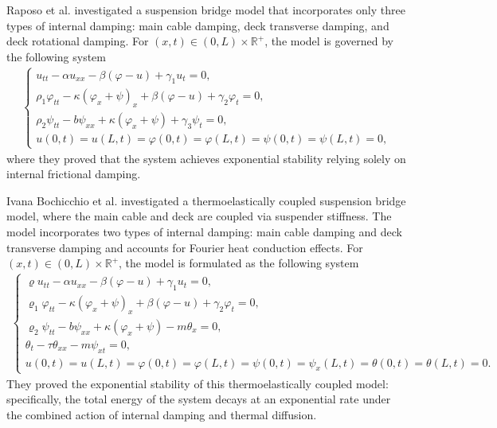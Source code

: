 \documentclass[11pt,reqno]{article}
\begin{document}
Raposo et al. \cite{MR4688212} investigated a suspension bridge model that incorporates only three types of internal damping: main cable damping, deck transverse damping, and deck rotational damping. For $(x,t) \in (0,L)\times \mathbb{R}^+$, the model is governed by the following system
	\begin{align*}
		\begin{cases}
			u_{tt} - \alpha u_{xx} - \beta(\varphi - u) + \gamma_1 u_t = 0,  \\
			\rho_1 \varphi_{tt} - \kappa (\varphi_x + \psi)_x + \beta (\varphi - u) + \gamma_2 \varphi_t = 0, \\
			\rho_2 \psi_{tt} - b \psi_{xx} + \kappa (\varphi_x + \psi) + \gamma_3 \psi_t = 0,\\
			u(0,t)=u(L,t)=\varphi(0,t)=\varphi(L,t)=\psi(0,t)=\psi(L,t)=0,
		\end{cases}
	\end{align*}
where they proved that the system achieves exponential stability relying solely on internal frictional damping.
	
Ivana Bochicchio et al. \cite{MR4149715} investigated a thermoelastically coupled suspension bridge model, where the main cable and deck are coupled via suspender stiffness. The model incorporates two types of internal damping: main cable damping and deck transverse damping and accounts for Fourier heat conduction effects. For $(x,t) \in (0,L)\times \mathbb{R}^+$, the model is formulated as the following system
	\begin{align*}
		\begin{cases}
			\varrho u_{tt} - \alpha u_{xx} - \beta(\varphi - u) + \gamma_1 u_t = 0, \\
			\varrho_1 \varphi_{tt} - \kappa(\varphi_x + \psi)_x + \beta(\varphi - u) + \gamma_2 \varphi_t = 0, \\
			\varrho_2 \psi_{tt} - b\psi_{xx} + \kappa(\varphi_x + \psi) - m\theta_x = 0, \\
			\theta_t - \tau \theta_{xx} - m\psi_{xt} = 0, \\
			u(0,t)=u(L,t)=\varphi(0,t)=\varphi(L,t)=\psi(0,t)=\psi_x(L,t)=\theta(0,t)=\theta(L,t)=0.
		\end{cases}
	\end{align*}
They proved the exponential stability of this thermoelastically coupled model: specifically, the total energy of the system decays at an exponential rate under the combined action of internal damping and thermal diffusion.
\end{document}

